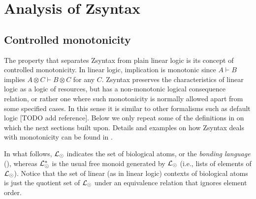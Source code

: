 \section{Analysis of Zsyntax}\label{sec:zsyntax}

\subsection{Controlled monotonicity}

The property that separates Zsyntax from plain linear logic is
its concept of controlled monotonicity. In linear logic, implication is
monotonic since $A \vdash B$ implies $A \otimes C \vdash B \otimes C$ for any
$C$. Zsyntax preserves the characteristics of linear logic as a logic of
resources, but has a non-monotonic logical consequence relation, or rather one
where such monotonicity is normally allowed apart from some specified cases. In
this sense it is similar to other formalisms such as default logic [TODO add
reference]. Below we only repeat some of the definitions in
\cite{adding-logic} on which the next sections built upon. Details and
examples on how Zsyntax deals with monotonicity can be found in
\cite{adding-logic}.

In what follows, $\mathcal{L}_{\odot}$ indicates the set of biological atoms, or the
\emph{bonding language} (\cite{adding-logic}), whereas
$\mathcal{L}_{\odot}^*$ is the usual free monoid generated by $\mathcal{L}_{\odot}$ (i.e.,
lists of elements of $\mathcal{L}_{\odot}$). Notice that the set of linear (as in
linear logic) contexts of biological atoms is just the quotient set of
$\mathcal{L}_{\odot}$ under an equivalence relation that ignores element order.

